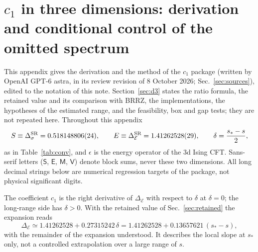 \documentclass[11pt,a4paper]{article}
\numberwithin{equation}{section}
\newcommand{\De}{\Delta_{\mathcal E}}
\newcommand{\Ds}{\Delta_\sigma}
\begin{document}
\section{\texorpdfstring{$c_1$}{c1} in three dimensions: derivation and conditional control of the omitted spectrum}\label{app:cone}
This appendix gives the derivation and the method of the $c_1$ package (written by OpenAI GPT-6 astra, in its review
revision of 8 October 2026; Sec.~\ref{sec:sources}), edited to the notation of this note. Section~\ref{sec:d3} states
the ratio formula, the retained value and its comparison with BRRZ, the implementations, the hypotheses of the
estimated range, and the feasibility, box and gap tests; they are not repeated here. Throughout this appendix
\begin{equation}
 S\equiv\Ds^{\rm SR}=0.518148806(24),\qquad E\equiv\De^{\rm SR}=1.41262528(29),\qquad
 \delta=\frac{s_*-s}{2},
\end{equation}
as in Table~\ref{tab:conv}, and $\epsilon$ is the energy operator of the 3d Ising CFT. Sans-serif letters
($\mathsf S$, $\mathsf E$, $\mathsf M$, $\mathsf V$) denote block sums, never these two dimensions. All long decimal
strings below are numerical regression targets of the package, not physical significant digits.

The coefficient $c_1$ is the right derivative of $\De$ with respect to $\delta$ at $\delta=0$; the long-range side has $\delta>0$. With the retained value
of Sec.~\ref{sec:retained} the expansion reads
\begin{equation}
 \De\simeq1.41262528+0.27315242\,\delta=1.41262528+0.13657621\,(s_*-s),
\end{equation}
with the remainder of the expansion understood. It describes the local slope at $s_*$ only, not a controlled
extrapolation over a large range of $s$.
\end{document}
